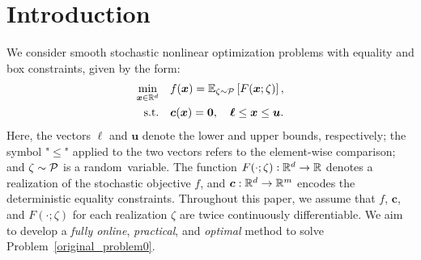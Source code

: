 \documentclass[aos]{imsart}
\numberwithin{equation}{section}
\theoremstyle{plain}
\begin{document}
\begin{frontmatter}

\begin{keyword}
\end{keyword}

\end{frontmatter}




\section{Introduction}

We consider smooth stochastic nonlinear optimization problems with equality and box constraints, given by the form:
\begin{equation}
\label{original_problem0}
	\begin{split}
		\min_{\bm{x} \in \mathbb{R}^{d}} & \hspace{1em} f(\bm{x}) = \mathbb{E}_{\zeta \sim \P} \left[ F(\bm{x}; \zeta) \right], \\
		\text{s.t.} & \hspace{1em} \bm{c}(\bm{x}) = \bm{0},\quad \bm{\ell} \leq \bm{x} \leq \bm{u}.
	\end{split}
\end{equation}
Here, the vectors $\bm{\ell}$ and $\bm{u}$ denote the lower and upper bounds, respectively; the symbol "$\leq$" applied to the two vectors refers to the element-wise comparison; and $\zeta\sim\P$ is a random~variable. The function $F(\cdot; \zeta):\mR^d\rightarrow \mR$ denotes a realization of the stochastic objective $f$, and $\bm{c}:\mR^d\rightarrow\mR^m$ encodes the deterministic equality constraints. 
Throughout this paper, we assume that $f$, $\bm{c}$, and $F(\cdot; \zeta)$ for each realization $\zeta$ are twice continuously differentiable. We aim to develop a \textit{fully online}, \textit{practical}, and \textit{optimal} method to solve Problem~\eqref{original_problem0}.
\end{document}
